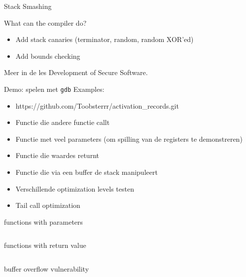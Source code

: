 \documentclass{beamer}
\begin{document}
\begin{frame}{Stack Smashing}
	\begin{block}{What can the compiler do?}
		\begin{itemize}
		    \item Add stack canaries (terminator, random, random XOR'ed)
		    \item Add bounds checking
		\end{itemize}
	\end{block}
	Meer in de les Development of Secure Software.
\end{frame}

\begin{frame}{Demo: spelen met \texttt{gdb}}
    Examples:
    \begin{itemize}
        \item https://github.com/Toobsterrr/activation\_records.git
        \item Functie die andere functie callt
        \item Functie met veel parameters (om spilling van de registers te demonstreren)
        \item Functie die waardes returnt
        \item Functie die via een buffer de stack manipuleert
        \item Verschillende optimization levels testen
        \item Tail call optimization
    \end{itemize}
\end{frame}

\begin{frame}{functions with parameters}
    \inputminted{c}{functions_calls_parameters.c}
\end{frame}

\begin{frame}{functions with return value}
    \inputminted{c}{functions_calls_return.c}
\end{frame}

\begin{frame}{buffer overflow vulnerability}
    \inputminted{c}{buffer_overflow_function.c}
\end{frame}
\end{document}
